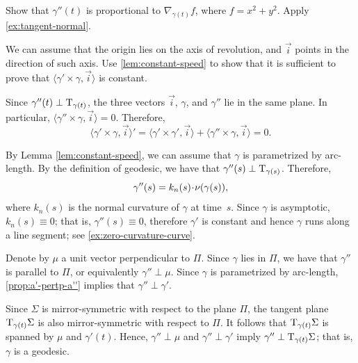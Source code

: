 
\setcounter{eqtn}{0}

 Show that $\gamma''(t)$ is proportional to $\nabla_{\gamma(t)} f$, where $f=x^2+y^2$. 
Apply \ref{ex:tangent-normal}.

We can assume that the origin lies on the axis of revolution, and $\vec i$ points in the direction of such axis.
Use \ref{lem:constant-speed} to show that it is sufficient to prove that 
$\langle\gamma'\times \gamma,\vec i\rangle$
is constant.

Since $\gamma''(t)\perp\mathrm{T}_{\gamma(t)}$, the three vectors $\vec i$, $\gamma$, and $\gamma''$ lie in the same plane.
In particular, $\langle\gamma''\times \gamma,\vec i\rangle=0$.
Therefore,
\[
\langle\gamma'\times \gamma,\vec i\rangle'
=
\langle\gamma'\times \gamma',\vec i\rangle+\langle\gamma''\times \gamma,\vec i\rangle =0
.\]



 By Lemma \ref{lem:constant-speed},
we can assume that $\gamma$ is parametrized by arc-length.
By the definition of geodesic, we have that $\gamma''(s)\perp\mathrm{T}_{\gamma(s)}$. 
Therefore, 
\[\gamma''(s)=k_n(s)\cdot\Norm(\gamma(s)),\]
where $k_n(s)$ is the normal curvature of $\gamma$ at time~$s$.
Since $\gamma$ is asymptotic, $k_n(s)\equiv 0$;
that is, $\gamma''(s)\equiv 0$, therefore $\gamma'$ is constant and hence $\gamma$ runs along a line segment; see \ref{ex:zero-curvature-curve}.




Denote by $\mu$ a unit vector perpendicular to $\Pi$.
Since $\gamma$ lies in $\Pi$, we have that $\gamma''$ is parallel to $\Pi$, or equivalently $\gamma''\perp \mu$.
Since $\gamma$ is parametrized by arc-length, \ref{prop:a'-pertp-a''} implies that $\gamma''\perp\gamma'$.

Since $\Sigma$ is mirror-symmetric with respect to the plane $\Pi$,
the tangent plane $\mathrm{T}_{\gamma(t)}\Sigma$ is also mirror-symmetric with respect to $\Pi$.
It follows that $\mathrm{T}_{\gamma(t)}\Sigma$ is spanned by $\mu$ and $\gamma'(t)$.
Hence, $\gamma''\perp \mu$ and $\gamma''\perp\gamma'$ imply $\gamma''\perp\mathrm{T}_{\gamma(t)}\Sigma$;
that is, $\gamma$ is a geodesic.



